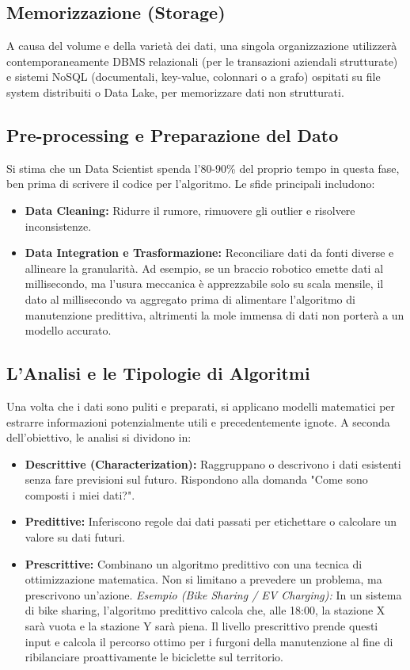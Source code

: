 \subsection{Memorizzazione (Storage)}
A causa del volume e della varietà dei dati, una singola organizzazione utilizzerà contemporaneamente DBMS relazionali (per le transazioni aziendali strutturate) e sistemi NoSQL (documentali, key-value, colonnari o a grafo) ospitati su file system distribuiti o Data Lake, per memorizzare dati non strutturati.

\subsection{Pre-processing e Preparazione del Dato}
Si stima che un Data Scientist spenda l'80-90\% del proprio tempo in questa fase, ben prima di scrivere il codice per l'algoritmo. Le sfide principali includono:
\begin{itemize}
    \item \textbf{Data Cleaning:} Ridurre il rumore, rimuovere gli outlier e risolvere inconsistenze.
    \item \textbf{Data Integration e Trasformazione:} Reconciliare dati da fonti diverse e allineare la granularità. Ad esempio, se un braccio robotico emette dati al millisecondo, ma l'usura meccanica è apprezzabile solo su scala mensile, il dato al millisecondo va aggregato prima di alimentare l'algoritmo di manutenzione predittiva, altrimenti la mole immensa di dati non porterà a un modello accurato.
\end{itemize}

\subsection{L'Analisi e le Tipologie di Algoritmi}
Una volta che i dati sono puliti e preparati, si applicano modelli matematici per estrarre informazioni potenzialmente utili e precedentemente ignote. A seconda dell'obiettivo, le analisi si dividono in:
\begin{itemize}
    \item \textbf{Descrittive (Characterization):} Raggruppano o descrivono i dati esistenti senza fare previsioni sul futuro. Rispondono alla domanda "Come sono composti i miei dati?".
    \item \textbf{Predittive:} Inferiscono regole dai dati passati per etichettare o calcolare un valore su dati futuri.
    \item \textbf{Prescrittive:} Combinano un algoritmo predittivo con una tecnica di ottimizzazione matematica. Non si limitano a prevedere un problema, ma prescrivono un'azione. 
    \textit{Esempio (Bike Sharing / EV Charging):} In un sistema di bike sharing, l'algoritmo predittivo calcola che, alle 18:00, la stazione X sarà vuota e la stazione Y sarà piena. Il livello prescrittivo prende questi input e calcola il percorso ottimo per i furgoni della manutenzione al fine di ribilanciare proattivamente le biciclette sul territorio.
\end{itemize}

